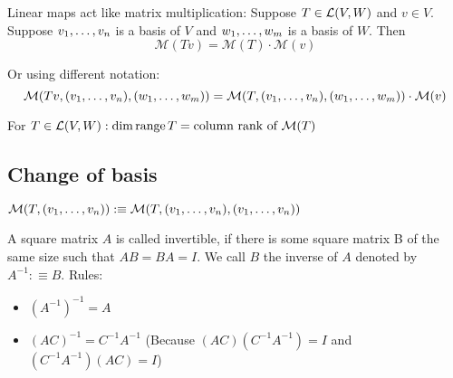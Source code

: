   \begin{thm}
    Linear maps act like matrix multiplication: Suppose $T\in {\mathcal{L}(V,W)}$ and $v\in V$. Suppose $v_1, \dots, v_n$ is a basis of $V$ and $w_1, \dots, w_m$ is a basis of $W$. Then
    \begin{equation}
      \mathcal{M} (Tv)=\mathcal{M}(T) \cdot \mathcal{M}(v)
    \end{equation}

    Or using different notation:
    \begin{equation}
      \mathcal{M} (Tv, (v_1, \dots, v_n), (w_1, \dots, w_m))=\mathcal{M}(T, (v_1, \dots, v_n), (w_1, \dots, w_m)) \cdot \mathcal{M}(v)
    \end{equation}

  \end{thm}

  \setcounter{thm}{77}
  \begin{thm}
    For $T \in {\mathcal{L}(V,W)}: \dim \operatorname{range} T = \text{column rank of } \mathcal{M} (T)$
  \end{thm}

  \subsection{Change of basis}

  \begin{mydef-non}
    $\mathcal{M}(T, (v_1, \dots, v_n)) :\equiv \mathcal{M}(T, (v_1, \dots, v_n),(v_1, \dots, v_n))$
  \end{mydef-non}

  \setcounter{thm}{79}
  \begin{thm}
    A square matrix $A$ is called invertible, if there is some square matrix B of the same size such that $AB=BA=I$. We call $B$ the inverse of $A$ denoted by $A^{-1} :\equiv B$. Rules:
    \begin{itemize}
      \item $(A^{-1})^{-1}=A$
      \item $(AC)^{-1} = C^{-1}A^{-1}$ (Because $(AC)(C^{-1}A^{-1})=I$ and $(C^{-1}A^{-1})(AC)=I$)
    \end{itemize}
  \end{thm}

